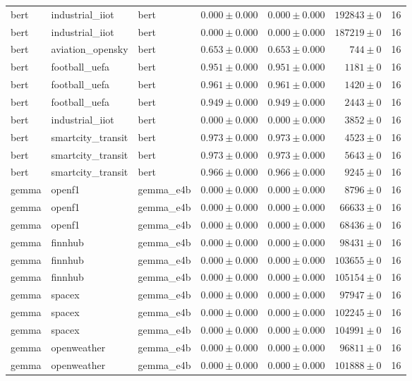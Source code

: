\begin{table}[htbp]
\begin{tabular}{l l l r r r r}
bert & industrial\_iiot & bert & $0.000\pm0.000$ & $0.000\pm0.000$ & $192843\pm0$ & 16 \\
bert & industrial\_iiot & bert & $0.000\pm0.000$ & $0.000\pm0.000$ & $187219\pm0$ & 16 \\
bert & aviation\_opensky & bert & $0.653\pm0.000$ & $0.653\pm0.000$ & $744\pm0$ & 16 \\
bert & football\_uefa & bert & $0.951\pm0.000$ & $0.951\pm0.000$ & $1181\pm0$ & 16 \\
bert & football\_uefa & bert & $0.961\pm0.000$ & $0.961\pm0.000$ & $1420\pm0$ & 16 \\
bert & football\_uefa & bert & $0.949\pm0.000$ & $0.949\pm0.000$ & $2443\pm0$ & 16 \\
bert & industrial\_iiot & bert & $0.000\pm0.000$ & $0.000\pm0.000$ & $3852\pm0$ & 16 \\
bert & smartcity\_transit & bert & $0.973\pm0.000$ & $0.973\pm0.000$ & $4523\pm0$ & 16 \\
bert & smartcity\_transit & bert & $0.973\pm0.000$ & $0.973\pm0.000$ & $5643\pm0$ & 16 \\
bert & smartcity\_transit & bert & $0.966\pm0.000$ & $0.966\pm0.000$ & $9245\pm0$ & 16 \\
gemma & openf1 & gemma\_e4b & $0.000\pm0.000$ & $0.000\pm0.000$ & $8796\pm0$ & 16 \\
gemma & openf1 & gemma\_e4b & $0.000\pm0.000$ & $0.000\pm0.000$ & $66633\pm0$ & 16 \\
gemma & openf1 & gemma\_e4b & $0.000\pm0.000$ & $0.000\pm0.000$ & $68436\pm0$ & 16 \\
gemma & finnhub & gemma\_e4b & $0.000\pm0.000$ & $0.000\pm0.000$ & $98431\pm0$ & 16 \\
gemma & finnhub & gemma\_e4b & $0.000\pm0.000$ & $0.000\pm0.000$ & $103655\pm0$ & 16 \\
gemma & finnhub & gemma\_e4b & $0.000\pm0.000$ & $0.000\pm0.000$ & $105154\pm0$ & 16 \\
gemma & spacex & gemma\_e4b & $0.000\pm0.000$ & $0.000\pm0.000$ & $97947\pm0$ & 16 \\
gemma & spacex & gemma\_e4b & $0.000\pm0.000$ & $0.000\pm0.000$ & $102245\pm0$ & 16 \\
gemma & spacex & gemma\_e4b & $0.000\pm0.000$ & $0.000\pm0.000$ & $104991\pm0$ & 16 \\
gemma & openweather & gemma\_e4b & $0.000\pm0.000$ & $0.000\pm0.000$ & $96811\pm0$ & 16 \\
gemma & openweather & gemma\_e4b & $0.000\pm0.000$ & $0.000\pm0.000$ & $101888\pm0$ & 16 \\

\end{tabular}
\end{table}
